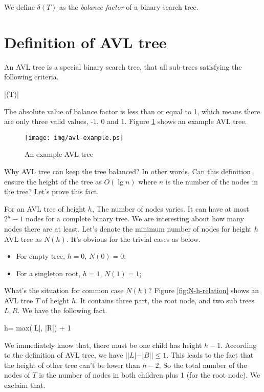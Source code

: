 \documentclass{article}
\begin{document}
We define $\delta(T)$ as the {\em balance factor} of a binary search
tree.

\section{Definition of AVL tree}

An AVL tree is a special binary search tree, that all sub-trees
satisfying the following criteria.

\be
  |\delta(T)| 
\ee

The absolute value of balance factor is less than or equal to 1, which
means there are only three valid values, -1, 0 and 1. Figure \ref{fig:avl-example} shows an example AVL tree.

\begin{figure}[htbp]
   \centering
   \texttt{[image: img/avl-example.ps]}
   \caption{An example AVL tree} \label{fig:avl-example}
\end{figure}


Why AVL tree can keep the tree balanced? In other words, Can this definition
ensure the height of the tree as $O(\lg n)$ where $n$ is the number of
the nodes in the tree? Let's prove this fact.

For an AVL tree of height $h$, The number of nodes varies. It can have at
most $2^h-1$ nodes for a complete binary tree. We are interesting about
how many nodes there are at least. Let's denote the minimum number of nodes
for height $h$ AVL tree as $N(h)$. It's obvious for the trivial cases
as below.

\begin{itemize}
\item For empty tree, $h=0$, $N(0)=0$;
\item For a singleton root, $h=1$, $N(1)=1$;
\end{itemize}

What's the situation for common case $N(h)$? Figure \ref{fig:N-h-relation}
shows an AVL tree $T$ of height $h$. It contains three part, the root node,
and two sub trees $L, R$. We have the following fact.

\be
  h= max(|L|, |R|) + 1
\ee

We immediately know that, there must be one child has height $h-1$. According
to the definition of AVL tree, we have
$||L|-|B|| \leq 1$. This leads to the fact that the height of
other tree can't be lower than $h-2$, So the total number of the nodes
of $T$ is the number of nodes in both children plus 1 (for the root node).
We exclaim that.
\end{document}
